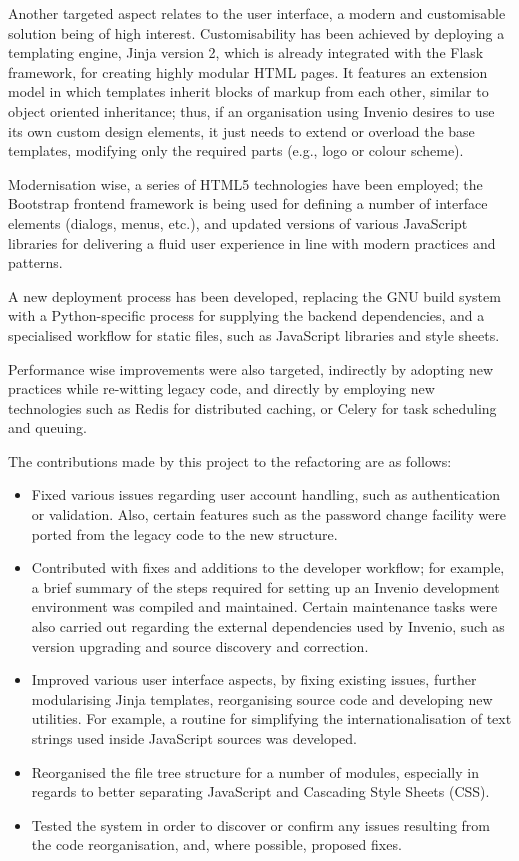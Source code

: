 Another targeted aspect relates to the user interface, a modern and
customisable solution being of high interest. Customisability has been achieved
by deploying a templating engine, Jinja version 2, which is already integrated
with the Flask framework, for creating highly modular HTML pages. It features
an extension model in which templates inherit blocks of markup from each other,
similar to object oriented inheritance; thus, if an organisation using Invenio
desires to use its own custom design elements, it just needs to extend or
overload the base templates, modifying only the required parts (e.g., logo or
colour scheme).

Modernisation wise, a series of HTML5 technologies have been employed; the
Bootstrap \cite{ref:bootstrap} frontend framework is being used for defining a
number of interface elements (dialogs, menus, etc.), and updated versions of
various JavaScript libraries for delivering a fluid user experience in line
with modern practices and patterns.

A new deployment process has been developed, replacing the GNU build system
with a Python-specific process for supplying the backend dependencies, and a
specialised workflow for static files, such as JavaScript libraries and style
sheets.

Performance wise improvements were also targeted, indirectly by adopting new
practices while re-witting legacy code, and directly by employing new
technologies such as Redis \cite{ref:redis} for distributed caching, or Celery
\cite{ref:celery} for task scheduling and queuing.

The contributions made by this project to the refactoring are as follows:
\begin{itemize}
  \item Fixed various issues regarding user account handling, such as
        authentication or validation. Also, certain features such as the
        password change facility were ported from the legacy code to the new
        structure.
  \item Contributed with fixes and additions to the developer workflow; for
        example, a brief summary of the steps required for setting up an Invenio
        development environment was compiled and maintained. Certain
        maintenance tasks were also carried out regarding the external
        dependencies used by Invenio, such as version upgrading and source
        discovery and correction.
  \item Improved various user interface aspects, by fixing existing issues,
        further modularising Jinja templates, reorganising source code and
        developing new utilities. For example, a routine for simplifying the
        internationalisation of text strings used inside JavaScript sources
        was developed.
  \item Reorganised the file tree structure for a number of modules, especially
        in regards to better separating JavaScript and Cascading Style Sheets
        (CSS).
  \item Tested the system in order to discover or confirm any issues resulting
        from the code reorganisation, and, where possible, proposed fixes.
\end{itemize}

